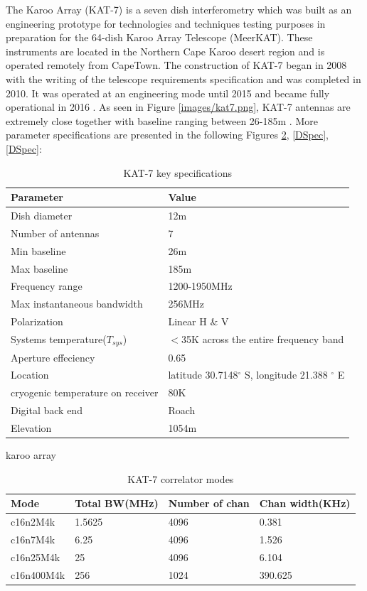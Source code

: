 The Karoo Array (KAT-7) is a seven dish interferometry which was built as an engineering prototype for technologies and techniques testing purposes in preparation for the 64-dish Karoo Array Telescope (MeerKAT). These instruments are located in the Northern Cape Karoo desert region and is operated remotely from CapeTown. The construction of  KAT-7 began in
2008 with the writing of the telescope requirements specification and was completed in 2010.  It was operated at an engineering mode until 2015  and became fully operational in 2016  \citep{foley2016engineering}. As seen in Figure \ref{images/kat7.png}, KAT-7 antennas are extremely close together with baseline ranging between 26-185m \citep{carignan2013kat}. More parameter specifications are presented in the following Figures \ref{K7 modes}, \ref{DSpec},\ref{DSpec}:

\begin{table}[H]\centering
\begin{tabular}{l l }
\toprule
\textbf{Parameter} & \textbf{Value}\\
\midrule
Dish diameter&12m \\
Number of antennas& 7\\
Min baseline & 26m\\
Max baseline & 185m\\
Frequency range & 1200-1950MHz\\
Max instantaneous bandwidth &256MHz\\
Polarization   & Linear H $\&$ V\\
Systems temperature($T_{sys}$) & $<$35K across the entire frequency band\\
Aperture effeciency & 0.65\\
Location &  latitude 30.7148$^{\circ}$ S, longitude 21.388 $^{\circ}$ E\\
cryogenic temperature on receiver & 80K\\
Digital back end & Roach \\
Elevation & 1054m\\
\bottomrule
\end{tabular}
\caption{KAT-7 key specifications \citep{foley2016engineering}}
\label{K7 spec}
\end{table}

karoo array
\begin{table}[H]\centering
\begin{tabular}{l l l l}
\toprule
\textbf{Mode}& \textbf{Total BW(MHz)} & \textbf{Number of chan} & \textbf{Chan width(KHz)} \\
\midrule
c16n2M4k  &  1.5625	& 4096& 	0.381\\
c16n7M4k & 6.25 & 	4096& 	1.526\\
c16n25M4k& 	25&	4096& 	6.104\\
c16n400M4k&  256& 	1024& 	390.625\\
\bottomrule
\end{tabular}
\caption{ KAT-7 correlator modes \citep{carignan2013kat}}
\label{K7 modes}
\end{table}



